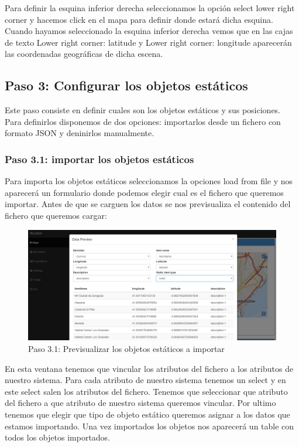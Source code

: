 Para definir la esquina inferior derecha seleccionamos la opción select lower right corner y hacemos click en el mapa para definir donde estará dicha esquina. Cuando hayamos seleccionado la esquina inferior derecha vemos que en las cajas de texto Lower right corner: latitude y Lower right corner: longitude aparecerán las coordenadas geográficas de dicha escena.


\subsection{Paso 3: Configurar los objetos estáticos}

Este paso consiste en definir cuales son los objetos estáticos y sus posiciones. Para definirlos disponemos de dos opciones: importarlos desde un fichero con formato JSON y deninirlos manualmente.

\subsubsection{Paso 3.1: importar los objetos estáticos}

Para importa los objetos estáticos seleccionamos la opciones load from file y nos aparecerá un formulario donde podemos elegir cual es el fichero que queremos importar. Antes de que se carguen los datos se nos previsualiza el contenido del fichero que queremos cargar:

\begin{figure}[H]
	\centering\includegraphics[scale=0.35]{imagenes/capitulo9/crear-escena-3-1.JPG}
	\caption{Paso 3.1: Previsualizar los objetos estáticos a importar}
	\label{img:paso3-1-1}
\end{figure}

En esta ventana tenemos que vincular los atributos del fichero a los atributos de nuestro sistema. Para cada atributo de nuestro sistema tenemos un select y en este select salen los atributos del fichero. Tenemos que seleccionar que atributo del fichero a que atributo de nuestro sistema queremos vincular. Por ultimo tenemos que elegir que tipo de objeto estático queremos asignar a los datos que estamos importando. Una vez importados los objetos nos aparecerá un table con todos los objetos importados.

